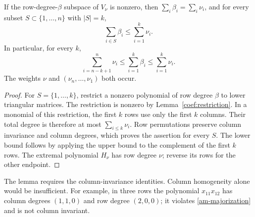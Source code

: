 \begin{lemma}\label{am-weights}
If the row-degree-$\beta$ subspace of $V_\nu$ is nonzero, then
$\sum_i\beta_i=\sum_i\nu_i$, and for every subset
$S\subset\{1,\ldots,n\}$ with $|S|=k$,
\begin{equation}\label{am-majorization}
       \sum_{i\in S}\beta_i\le\sum_{i=1}^k\nu_i.
\end{equation}
In particular, for every $k$,
\[
 \sum_{i=n-k+1}^n\nu_i\le\sum_{i=1}^k\beta_i
                              \le\sum_{i=1}^k\nu_i.
\]
The weights $\nu$ and $(\nu_n,\ldots,\nu_1)$ both occur.
\end{lemma}
\begin{proof}
For $S=\{1,\ldots,k\}$, restrict a nonzero polynomial of row degree
$\beta$ to lower triangular matrices. The restriction is nonzero by
Lemma~\ref{coef:restriction}. In a monomial of this restriction, the
first $k$ rows use only the first $k$ columns. Their total degree is
therefore at most $\sum_{i\le k}\nu_i$. Row permutations preserve
column invariance and column degrees, which proves the assertion for
every $S$. The lower bound follows by applying the upper bound to the
complement of the first $k$ rows. The extremal polynomial $H_\nu$ has
row degree $\nu$; reverse its rows for the other endpoint.
\end{proof}

The lemma requires the column-invariance identities. Column homogeneity
alone would be insufficient. For example, in three rows the polynomial
$x_{11}x_{12}$ has column degrees $(1,1,0)$ and row degree $(2,0,0)$;
it violates \eqref{am-majorization} and is not column invariant.

